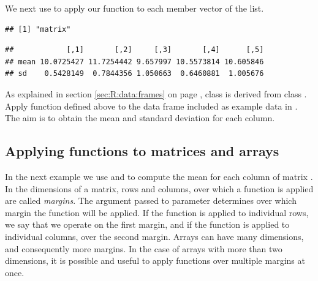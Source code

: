 \documentclass[krantz2]{krantz}\usepackage{knitr}
\begin{document}
\begin{explainbox}
We next use  to apply our function to each member vector of the list.

\begin{knitrout}\footnotesize
{}\color{fgcolor}\begin{kframe}
\begin{alltt}
 \hlkwb{<-} \hlstd{(} 
                  
                  \hlstd{=} \hlstd{(} \hlstd{=} \hlstd{,}  \hlstd{=} \hlstd{),}
                  \hlstd{=} \hlstd{)}
\end{alltt}
\begin{verbatim}
## [1] "matrix"
\end{verbatim}
\begin{alltt}
\end{alltt}
\begin{verbatim}
##            [,1]       [,2]     [,3]       [,4]      [,5]
## mean 10.0725427 11.7254442 9.657997 10.5573814 10.605846
## sd    0.5428149  0.7844356 1.050663  0.6460881  1.005676
\end{verbatim}
\end{kframe}
\end{knitrout}
\end{explainbox}

\begin{playground}
As explained in section \ref{sec:R:data:frames} on page \pageref{sec:R:data:frames}, class  is derived from class . Apply function  defined above to the data frame  included as example data in \Rlang. The aim is to obtain the mean and standard deviation for each column.
\end{playground}

\subsection{Applying functions to matrices and arrays}
In the next example we use  and  to compute the mean for each column of matrix . In \Rlang the dimensions of a matrix, rows and columns, over which a function is applied are called \emph{margins}. The argument passed to parameter  determines over which margin the function will be applied. If the function is applied to individual rows, we say that we operate on the first margin, and if the function is applied to individual columns, over the second margin. Arrays can have many dimensions, and consequently more margins. In the case of arrays with more than two dimensions, it is possible and useful to apply functions over multiple margins at once.
\end{document}
